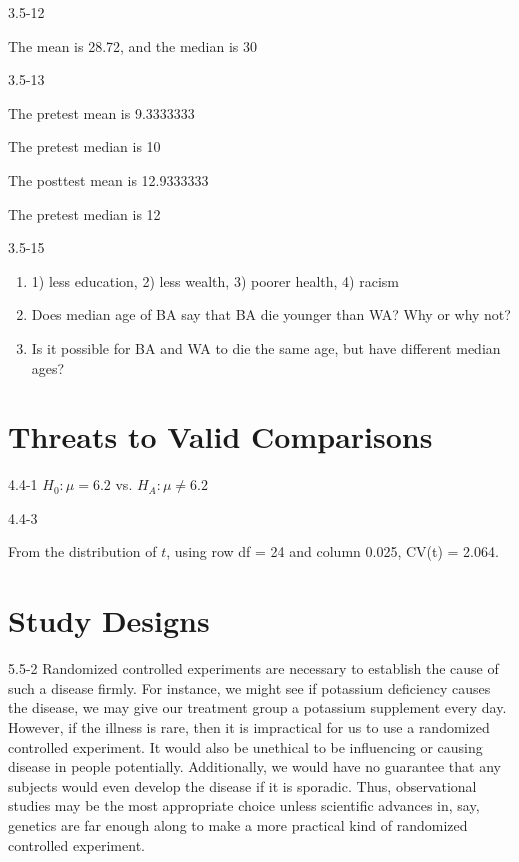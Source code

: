 \begin{exsol@solution}{3.5-12}


  The mean is 28.72, and the median is 30

\end{exsol@solution}
\begin{exsol@solution}{3.5-13}



	The pretest mean is  9.3333333


	The pretest median is 10


	The posttest mean is	12.9333333


The pretest median is 12

\end{exsol@solution}
\begin{exsol@solution}{3.5-15}
\begin{enumerate}
\item   1) less education, 2) less wealth, 3) poorer health, 4) racism
\item Does median age of BA say that BA die younger than WA? Why or why not?
\item Is it possible for BA and WA to die the same age, but have different median \\ ages?
\end{enumerate}
\end{exsol@solution}
\setcounter{chapter}{3}\chapter{Threats to Valid Comparisons}
\begin{exsol@solution}{4.4-1}
	  $H_0: \mu = 6.2$ vs. $H_A: \mu \neq 6.2$
\end{exsol@solution}
\begin{exsol@solution}{4.4-3}

    From the distribution of $t$, using row df = 24 and column 0.025, CV(t) = 2.064.
\end{exsol@solution}
\setcounter{chapter}{4}\chapter{Study Designs}
\begin{exsol@solution}{5.5-2}
Randomized controlled experiments are necessary to establish the cause of such a disease firmly. For instance, we might see if potassium deficiency causes the disease, we may give our treatment group a potassium supplement every day. However, if the illness is rare, then it is impractical for us to use a randomized controlled experiment.  It would also be unethical to be influencing or causing disease in people potentially.  Additionally, we would have no guarantee that any subjects would even develop the disease if it is sporadic. Thus, observational studies may be the most appropriate choice unless scientific advances in, say, genetics are far enough along to make a more practical kind of randomized controlled experiment.

\end{exsol@solution}
